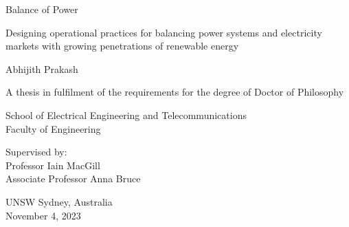 \documentclass[12pt,a4paper,]{report}
\begin{document}
\begin{titlepage}
    \begin{center}


        \vspace*{2.5cm}

        \huge
        Balance of Power

                \vspace{.5cm}

        \Large
        Designing operational practices for balancing power systems and
        electricity markets with growing penetrations of renewable
        energy
        

        \vspace{1.5cm}

        \Large
        Abhijith Prakash

        \vspace{1.5cm}

        \normalsize
        A thesis in fulfilment of the requirements for the degree of Doctor
of Philosophy

        \vfill

        \normalsize
        School of Electrical Engineering and Telecommunications\\
        Faculty of Engineering\\

        \vfill

        \normalsize
        Supervised by:\\
        Professor Iain MacGill \\ Associate Professor Anna Bruce

        \vspace{0.8cm}


        \normalsize
        UNSW Sydney, Australia\\
        November 4, 2023


    \end{center}
\end{titlepage}
\end{document}
